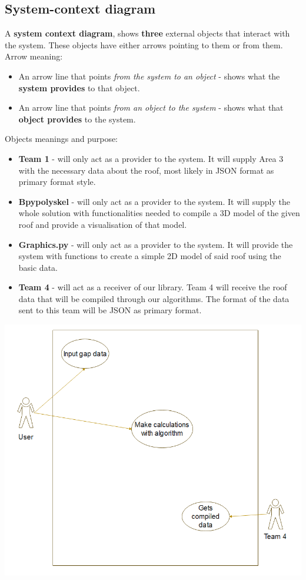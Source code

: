 \documentclass[a4paper,12pt,fleqn]{article}
\begin{document}
\subsection{System-context diagram}
A \textbf{system context diagram}, shows \textbf{three} external objects that interact
with the system. These objects have either arrows pointing to them or from them.\\ Arrow meaning:
\begin{itemize}
    \item An arrow line that points \textit{from the system to an object} - shows
what the \textbf{system provides} to that object.
    \item An arrow line that points \textit{from an object to the
system} - shows what that \textbf{object provides} to the system.
\end{itemize}
Objects meanings and purpose:
\begin{itemize}
    \item \textbf{Team 1} - will only act as a provider to the system. It will supply Area 3 with the necessary data about the roof, most likely in JSON format as primary format style.
    \item \textbf{Bpypolyskel} - will only act as a provider to the system. It will supply the whole solution with functionalities needed to compile a 3D model of the given roof and provide a visualisation of that model.
    \item \textbf{Graphics.py} - will only act as a provider to the system. It will provide the system with functions to create a simple 2D model of said roof using the basic data.
    \item \textbf{Team 4} - will act as a receiver of our library. Team 4 will receive the roof data that will be compiled through our algorithms. The format of the data sent to this team will be JSON as primary format.
\end{itemize}

\includegraphics[scale=0.4]{main/images/use-case.png}
\end{document}
